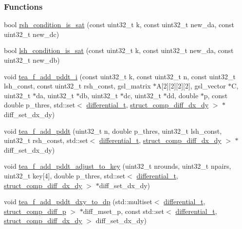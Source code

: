 \subsubsection*{\-Functions}
\begin{DoxyCompactItemize}
\item 
bool \hyperlink{tea-f-add-pddt_8cc_a9a9b0ca87b727a966ffb1842ffa389e3}{rsh\-\_\-condition\-\_\-is\-\_\-sat} (const uint32\-\_\-t k, const uint32\-\_\-t new\-\_\-da, const uint32\-\_\-t new\-\_\-dc)
\item 
bool \hyperlink{tea-f-add-pddt_8cc_a55f531edb6fd0ce85c20b47e890475e3}{lsh\-\_\-condition\-\_\-is\-\_\-sat} (const uint32\-\_\-t k, const uint32\-\_\-t new\-\_\-da, const uint32\-\_\-t new\-\_\-db)
\item 
void \hyperlink{tea-f-add-pddt_8cc_ae8e09fe95cc3eb4257b868d91f8924ec}{tea\-\_\-f\-\_\-add\-\_\-pddt\-\_\-i} (const uint32\-\_\-t k, const uint32\-\_\-t n, const uint32\-\_\-t lsh\-\_\-const, const uint32\-\_\-t rsh\-\_\-const, gsl\-\_\-matrix $\ast$\-A\mbox{[}2\mbox{]}\mbox{[}2\mbox{]}\mbox{[}2\mbox{]}\mbox{[}2\mbox{]}, gsl\-\_\-vector $\ast$\-C, uint32\-\_\-t $\ast$da, uint32\-\_\-t $\ast$db, uint32\-\_\-t $\ast$dc, uint32\-\_\-t $\ast$dd, double $\ast$p, const double p\-\_\-thres, std\-::set$<$ \hyperlink{structdifferential__t}{differential\-\_\-t}, \hyperlink{structstruct__comp__diff__dx__dy}{struct\-\_\-comp\-\_\-diff\-\_\-dx\-\_\-dy} $>$ $\ast$diff\-\_\-set\-\_\-dx\-\_\-dy)
\item 
void \hyperlink{tea-f-add-pddt_8cc_af962bfb5724a4f1dd45fdb2fdeac49f4}{tea\-\_\-f\-\_\-add\-\_\-pddt} (uint32\-\_\-t n, double p\-\_\-thres, uint32\-\_\-t lsh\-\_\-const, uint32\-\_\-t rsh\-\_\-const, std\-::set$<$ \hyperlink{structdifferential__t}{differential\-\_\-t}, \hyperlink{structstruct__comp__diff__dx__dy}{struct\-\_\-comp\-\_\-diff\-\_\-dx\-\_\-dy} $>$ $\ast$diff\-\_\-set\-\_\-dx\-\_\-dy)
\item 
void \hyperlink{tea-f-add-pddt_8cc_aa60ac75c659872644ff116ea451bed41}{tea\-\_\-f\-\_\-add\-\_\-pddt\-\_\-adjust\-\_\-to\-\_\-key} (uint32\-\_\-t nrounds, uint32\-\_\-t npairs, uint32\-\_\-t key\mbox{[}4\mbox{]}, double p\-\_\-thres, std\-::set$<$ \hyperlink{structdifferential__t}{differential\-\_\-t}, \hyperlink{structstruct__comp__diff__dx__dy}{struct\-\_\-comp\-\_\-diff\-\_\-dx\-\_\-dy} $>$ $\ast$diff\-\_\-set\-\_\-dx\-\_\-dy)
\item 
void \hyperlink{tea-f-add-pddt_8cc_a6334dfbee70edb6980086f15da98f826}{tea\-\_\-f\-\_\-add\-\_\-pddt\-\_\-dxy\-\_\-to\-\_\-dp} (std\-::multiset$<$ \hyperlink{structdifferential__t}{differential\-\_\-t}, \hyperlink{structstruct__comp__diff__p}{struct\-\_\-comp\-\_\-diff\-\_\-p} $>$ $\ast$diff\-\_\-mset\-\_\-p, const std\-::set$<$ \hyperlink{structdifferential__t}{differential\-\_\-t}, \hyperlink{structstruct__comp__diff__dx__dy}{struct\-\_\-comp\-\_\-diff\-\_\-dx\-\_\-dy} $>$ diff\-\_\-set\-\_\-dx\-\_\-dy)

\end{DoxyCompactItemize}
